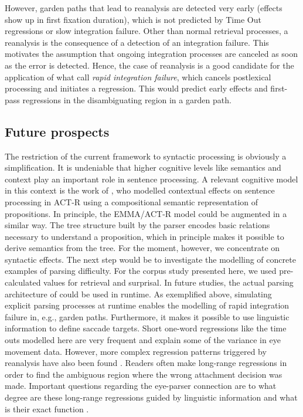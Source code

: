 However, garden paths that lead to reanalysis are detected very early (effects show up in first fixation duration), which is not predicted by Time Out regressions or slow integration failure. 
Other than normal retrieval processes, a reanalysis is the consequence of a detection of an integration failure.  This motivates the assumption that ongoing integration processes are canceled as soon as the error is detected.  Hence, the case of reanalysis is a good candidate for the application of what \cite{Reichle1998} call  \emph{rapid integration failure}, which cancels postlexical processing and initiates a regression.  This would predict early effects and first-pass regressions in the disambiguating region in a garden path.

\subsection{Future prospects}
The restriction of the current framework to syntactic processing is obviously a simplification. It is undeniable that higher cognitive levels like semantics and context play an important role in sentence processing.  A relevant cognitive model in this context is the work of \cite{Budiu2004}, who modelled contextual effects on sentence processing in ACT-R using a compositional semantic representation of propositions. In principle, the EMMA/ACT-R model could be augmented in a similar way.
The tree structure built by the \cite{LewisVasishth2005} parser encodes basic relations necessary to understand a proposition, which in principle makes it possible to derive semantics from the tree. For the moment, however, we concentrate on syntactic effects.
The next step would be to investigate the modelling of concrete examples of parsing difficulty. For the corpus study presented here, we used pre-calculated values for retrieval and surprisal. In future studies, the actual parsing architecture of \cite{LewisVasishth2005} could be used in runtime.  As exemplified above, simulating explicit parsing processes at runtime enables the modelling of rapid integration failure in, e.g., garden paths. Furthermore, it makes it possible to use linguistic information to define saccade targets. Short one-word regressions like the time outs modelled here are very frequent and explain some of the variance in eye movement data.  However, more complex regression patterns triggered by reanalysis have also been found \citep[e.g.,][]{Frazier1982a,MalsburgVasishth2011,MalsburgVasishth2012,Meseguer2002}. Readers often make long-range regressions in order to find the ambiguous region where the wrong attachment decision was made. Important questions regarding the eye-parser connection are to what degree are these long-range regressions guided by linguistic information and what is their exact function \citep[e.g.,][]{Booth2013,Inhoff:2005p140,MitchellEtAl2008,Weger2007}.
